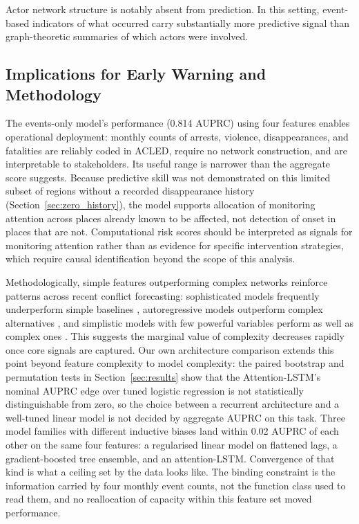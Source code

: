 \documentclass[pdflatex,sn-mathphys-num]{sn-jnl}%
\theoremstyle{thmstyleone}%
\theoremstyle{thmstyletwo}%
\theoremstyle{thmstylethree}%
\begin{document}
Actor network structure is notably absent from prediction. In this setting, event-based indicators of what occurred carry substantially more predictive signal than graph-theoretic summaries of which actors were involved.

\subsection{Implications for Early Warning and Methodology}

The events-only model's performance (0.814 AUPRC) using four features enables operational deployment: monthly counts of arrests, violence, disappearances, and fatalities are reliably coded in ACLED, require no network construction, and are interpretable to stakeholders. Its useful range is narrower than the aggregate score suggests. Because predictive skill was not demonstrated on this limited subset of regions without a recorded disappearance history (Section~\ref{sec:zero_history}), the model supports allocation of monitoring attention across places already known to be affected, not detection of onset in places that are not. Computational risk scores should be interpreted as signals for monitoring attention rather than as evidence for specific intervention strategies, which require causal identification beyond the scope of this analysis.

Methodologically, simple features outperforming complex networks reinforce patterns across recent conflict forecasting: sophisticated models frequently underperform simple baselines \cite{hegre2024views}, autoregressive models outperform complex alternatives \cite{chadefaux2025endogenous}, and simplistic models with few powerful variables perform as well as complex ones \cite{vesco2022united}. This suggests the marginal value of complexity decreases rapidly once core signals are captured. Our own architecture comparison extends this point beyond feature complexity to model complexity: the paired bootstrap and permutation tests in Section~\ref{sec:results} show that the Attention-LSTM's nominal AUPRC edge over tuned logistic regression is not statistically distinguishable from zero, so the choice between a recurrent architecture and a well-tuned linear model is not decided by aggregate AUPRC on this task. Three model families with different inductive biases land within 0.02 AUPRC of each other on the same four features: a regularised linear model on flattened lags, a gradient-boosted tree ensemble, and an attention-LSTM. Convergence of that kind is what a ceiling set by the data looks like. The binding constraint is the information carried by four monthly event counts, not the function class used to read them, and no reallocation of capacity within this feature set moved performance.
\end{document}
